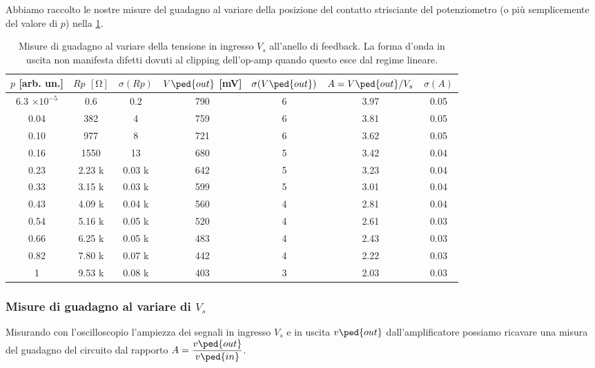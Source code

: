 \documentclass[10pt, a4paper, italian]{article}
\begin{document}
Abbiamo raccolto le nostre misure del guadagno al variare della posizione del
contatto strisciante del potenziometro (o più semplicemente del valore di $p$)
nella \cref{tab: VoutRp}.
\begin{table}[htbp]
\centering
\begin{tabular}{ccccccc}
\toprule
$p$ [arb. un.] & $Rp$ $[\si{\ohm}]$ & $\sigma(Rp)$ & $V\ped{out}$ [mV] &
$\sigma(V\ped{out})$ & $A = V\ped{out}/V_s$ & $\sigma(A)$ \\
\midrule
\midrule
6.3 $\times 10^{-5}$      & 0.6    & 0.2 		& 790    & 6    & 3.97 & 0.05 \\
0.04         & 382		  & 4  	   & 759        & 6      & 3.81 & 0.05 \\
0.10         & 977		  & 8	   & 721        & 6      & 3.62 & 0.05 \\
0.16         & 1550       & 13     & 680        & 5      & 3.42 & 0.04 \\
0.23         & 2.23 k	  & 0.03 k & 642        & 5      & 3.23 & 0.04 \\
0.33         & 3.15 k	  & 0.03 k & 599        & 5      & 3.01 & 0.04 \\
0.43         & 4.09 k	  & 0.04 k & 560        & 4      & 2.81 & 0.04 \\
0.54         & 5.16 k	  & 0.05 k & 520        & 4      & 2.61 & 0.03 \\
0.66         & 6.25 k     & 0.05 k & 483        & 4      & 2.43 & 0.03 \\
0.82         & 7.80 k     & 0.07 k & 442        & 4      & 2.22 & 0.03 \\
1            & 9.53 k     & 0.08 k & 403        & 3      & 2.03 & 0.03 \\  
\bottomrule
\end{tabular}
\caption{Misure di guadagno al variare della tensione in ingresso $V_s$
all'anello di feedback. La forma d'onda in uscita non manifesta difetti
dovuti al clipping dell'op-amp quando questo esce dal regime lineare.
\label{tab: VoutRp}}
\end{table}

\subsubsection{Misure di guadagno al variare di $V_s$}\label{sbs: Vout/Vs}
Misurando con l'oscilloscopio l'ampiezza dei segnali in ingresso $V_s$
e in uscita $v\ped{out}$ dall'amplificatore possiamo ricavare una misura del
guadagno del circuito dal rapporto $A = \dfrac{v\ped{out}}{v\ped{in}}$.
\end{document}

